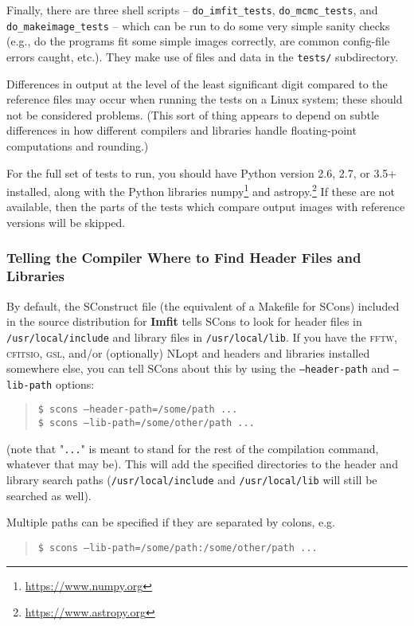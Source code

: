 \documentclass[10pt,a4paper,article]{memoir}
\newcommand{\imfit}{\textbf{Imfit}}
\begin{document}
Finally, there are three shell scripts -- \texttt{do\_imfit\_tests},
\texttt{do\_mcmc\_tests}, and \texttt{do\_makeimage\_tests} -- which can
be run to do some very simple sanity checks (e.g., do the programs fit
some simple images correctly, are common config-file errors caught,
etc.). They make use of files and data in the \texttt{tests/}
subdirectory. 

Differences in output at the level of the least significant digit
compared to the reference files may occur when running the tests on a
Linux system; these should not be considered problems. (This sort of
thing appears to depend on subtle differences in how different compilers
and libraries handle floating-point computations and rounding.)

For the full set of tests to run, you should have Python version 2.6,
2.7, or 3.5+ installed, along with the Python libraries
numpy\footnote{\url{https://www.numpy.org}} and
astropy.\footnote{\url{https://www.astropy.org}} If these are not
available, then the parts of the tests which compare output images with
reference versions will be skipped.



\subsubsection{Telling the Compiler Where to Find Header Files and Libraries}

By default, the SConstruct file (the equivalent of a Makefile for SCons) included
in the source distribution for \imfit{}
tells SCons to look for header files in \texttt{/usr/local/include} and
library files in \texttt{/usr/local/lib}. If you have the \textsc{fftw},
\textsc{cfitsio}, \textsc{gsl}, and/or (optionally) NLopt and headers and
libraries installed somewhere else, you can tell SCons about this by
using the
\texttt{--header-path} and \texttt{--lib-path} options:
\begin{quote}
\texttt{\$ scons --header-path=/some/path ...} \\
\texttt{\$ scons --lib-path=/some/other/path ...}
\end{quote}
(note that "\texttt{...}" is meant to stand for the rest of the compilation command,
whatever that may be). This will add the specified directories to the
header and library search paths (\texttt{/usr/local/include} and \texttt{/usr/local/lib}
will still be searched as well).

Multiple paths can be specified if they are separated by colons, e.g.
\begin{quote}
\texttt{\$ scons --lib-path=/some/path:/some/other/path ...} \\
\end{quote}
\end{document}
